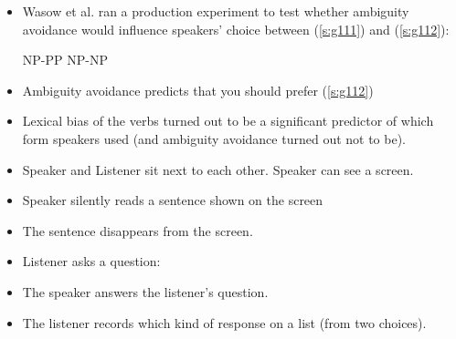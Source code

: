 \documentclass[a4paper,landscape,headrule,footrule,dvips]{foils}
\begin{document}
\begin{center}
  \begin{bchart}[max=100,step=25,unit=\%,scale=2.2]
     
     
     
     
  \end{bchart}
\end{center}

\begin{itemize}
\item Wasow et al. ran a production experiment to test 
whether ambiguity avoidance would influence 
speakers’ choice between (\ref{s:g111}) and (\ref{s:g112}): 
\begin{exe}
\ex \label{s:g111}  \hfill NP-PP
\ex \label{s:g112}  \hfill NP-NP
\end{exe}
\item Ambiguity avoidance predicts that you should prefer (\ref{s:g112})
\item Lexical bias of the verbs turned out to be a significant 
predictor of which form speakers used (and ambiguity 
avoidance turned out not to be).
\end{itemize}


\begin{itemize}
\item Speaker and Listener sit next to each other.  Speaker can see a screen.
\item Speaker silently reads a sentence shown on the screen \\ 
\item The sentence disappears from the screen.
\item Listener asks a question:
\\ 
\item The speaker answers the listener's question.
\\ 
\item The listener records which kind of response on 
a list (from two choices).
\end{itemize}
\end{document}
